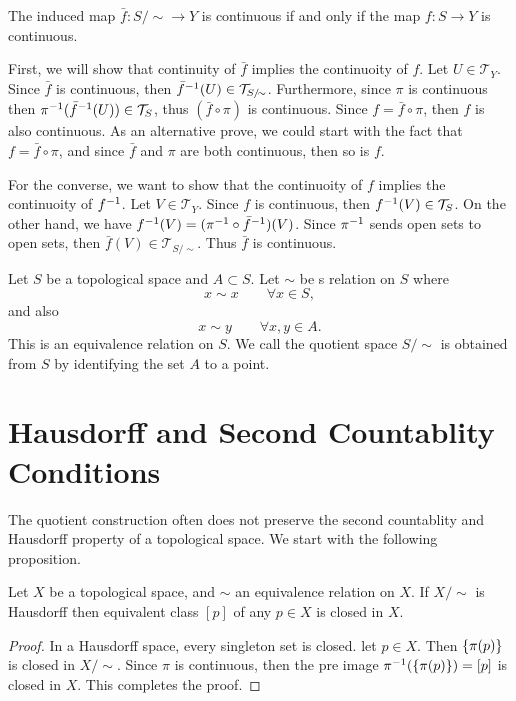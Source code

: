 \begin{proposition}
	\label{prop:ContinousInducedmap}
	The induced map $ \bar{f}:S/\sim \to Y $ is continuous if and only if the map $ f: S \to Y $ is continuous.
\end{proposition}
\begin{solution}
	First, we will show that continuity of $ \bar{f} $ implies the continuoity of $ f $. Let $ U \in \mathcal{T}_Y $. Since $ \bar{f} $ is continuous, then $ \inv{\bar{f}}(U) \in \mathcal{T}_{S/\sim} $. Furthermore, since $ \pi $ is continuous then $ \pi^{-1}(\bar{f}^{-1}(U)) \in \mathcal{T}_{S} $, thus $ (\bar{f}\circ \pi) $ is continuous. Since $  f = \bar{f}\circ \pi $, then $ f $ is also continuous. As an alternative prove, we could start with the fact that $ f = \bar{f}\circ \pi $, and since $ \bar{f} $ and $ \pi $ are both continuous, then so is $ f $.
	
	For the converse, we want to show that the continuoity of $ f $ implies the continuoity of $ f^{-1} $. Let $ V \in \mathcal{T}_Y $. Since $ f $ is continuous, then $ f^{-1}(V) \in \mathcal{T}_S $. On the other hand, we have $ f^{-1}(V) =( \pi^{-1}\circ \bar{f}^{-1})(V) $. Since $ \pi^{-1} $ sends open sets to open sets, then $ \bar{f}(V) \in \mathcal{T}_{S/\sim} $. Thus $ \bar{f} $ is continuous.
\end{solution}

\begin{definition}
	Let $ S $ be a topological space and $ A \subset S $. Let $ \sim $ be s relation on $ S $ where 
	\[ x\sim x \qquad \forall x \in S, \]
	and also
	\[ x\sim y \qquad \forall x,y \in A. \]
	This is an equivalence relation on $ S $. We call the quotient space $ S/\sim $ is obtained from $ S $ by identifying the set $ A $ to a point.
\end{definition}

\section{Hausdorff and Second Countablity Conditions}
The quotient construction often does not preserve the second countablity and Hausdorff property of a topological space. We start with the following proposition.

\begin{proposition}
	Let $ X $ be a topological space, and $ \sim $ an equivalence relation on $ X $. If $ X/\sim $ is Hausdorff then equivalent class $ [p] $ of any $ p \in X $ is closed in $ X $.
\end{proposition}
\begin{proof}
	In a Hausdorff space, every singleton set is closed. let $ p \in X $. Then $ \{\pi(p)\} $ is closed in $ X/\sim $. Since $ \pi $ is continuous, then the pre image $ \pi^{-1}(\{\pi(p)\}) = [p] $ is closed in $ X $. This completes the proof.
\end{proof}

